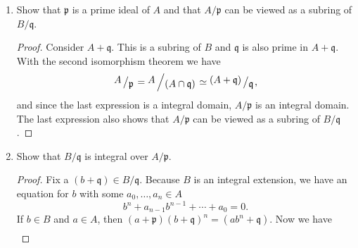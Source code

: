 \documentclass[a4paper]{article}
\newcommand{\bigslant}[2]{{\raisebox{.2em}{$#1$}\left/\raisebox{-.2em}{$#2$}\right.}}
\begin{document}
\begin{enumerate}
\begin{proof}
    For the other direction of the implication, let \(B\) be a field and fix an \(x \in A\). \(x\) is a unit in \(B\), so there is a \(y \in B\) with \(xy = 1\). Again, for \(y\) we have the expression
    \begin{align*}
      0 = a_0 + a_1 y + a_2 y^2 + \cdots + a_n y^n
    \end{align*}
    and if we multiply \(x^{n-1}\) on both sides, we yield
    \begin{align*}
      & 0 = a_0 x^{n-1} + a_1 x^{n-2} + a_2 x^{n-3} + \cdots + a_n y \\
      \iff & -a_0 x^{n-1} - a_1 x^{n-2} - a_2 x^{n-3} - \cdots - a_{n-1} =  a_n y \\
      \iff & a_n^{-1} (-a_0 x^{n-1} - a_1 x^{n-2} - a_2 x^{n-3} - \cdots - a_{n-1}) = y
    \end{align*}
    In other words, \(y\) is in \(A\) or in different words, \(A\) is a field.
  \end{proof}
  \newpage
  \item Show that \(\mathfrak{p}\) is a prime ideal of \(A\) and that \(A / \mathfrak{p}\) can be viewed as a subring of \(B / \mathfrak{q}\).
  \begin{proof}
    Consider \(A + \mathfrak{q}\). This is a subring of \(B\) and \(\mathfrak{q}\) is also prime in \(A + \mathfrak{q}\). With the second isomorphism theorem we have
    \begin{equation*}
      \bigslant{A}{\mathfrak{p}} = \bigslant{A}{(A \cap \mathfrak{q})} \simeq \bigslant{(A + \mathfrak{q})}{\mathfrak{q}} \text{,}
    \end{equation*}
    and since the last expression is a integral domain, \(A / \mathfrak{p}\) is an integral domain. The last expression also shows that \(A/\mathfrak{p}\) can be viewed as a subring of \(B / \mathfrak{q}\).
  \end{proof}
  \newpage
  \item Show that \(B / \mathfrak{q}\) is integral over \(A / \mathfrak{p}\).
  \begin{proof}
    Fix a \((b + \mathfrak{q}) \in B/\mathfrak{q}\). Because \(B\) is an integral extension, we have an equation for \(b\) with some \(a_0, \ldots, a_n \in A\)
    \begin{equation*}
      b^n + a_{n-1}b^{n-1} + \cdots + a_0 = 0\text{.}
    \end{equation*}
    If \(b \in B\) and \(a \in A\), then \((a + \mathfrak{p})(b + \mathfrak{q})^n = (ab^n + \mathfrak{q})\). Now we have
    \begin{align*}

\end{align*}
\end{proof}
\end{enumerate}
\end{document}
